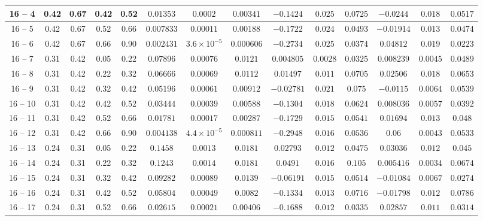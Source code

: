 \begin{longtable}{|*{14}{c|}}
\hline
16 -- 4 & 0.42 & 0.67 & 0.42 & 0.52 & $0.01353$ & $0.0002$ & $0.00341$ & $-0.1424$ & $0.025$ & $0.0725$ & $-0.0244$ & $0.018$ & $0.0517$ \\
\hline
16 -- 5 & 0.42 & 0.67 & 0.52 & 0.66 & $0.007833$ & $0.00011$ & $0.00188$ & $-0.1722$ & $0.024$ & $0.0493$ & $-0.01914$ & $0.013$ & $0.0474$ \\
\hline
16 -- 6 & 0.42 & 0.67 & 0.66 & 0.90 & $0.002431$ & $3.6\times 10^{-5}$ & $0.000606$ & $-0.2734$ & $0.025$ & $0.0374$ & $0.04812$ & $0.019$ & $0.0223$ \\
\hline
16 -- 7 & 0.31 & 0.42 & 0.05 & 0.22 & $0.07896$ & $0.00076$ & $0.0121$ & $0.004805$ & $0.0028$ & $0.0325$ & $0.008239$ & $0.0045$ & $0.0489$ \\
\hline
16 -- 8 & 0.31 & 0.42 & 0.22 & 0.32 & $0.06666$ & $0.00069$ & $0.0112$ & $0.01497$ & $0.011$ & $0.0705$ & $0.02506$ & $0.018$ & $0.0653$ \\
\hline
16 -- 9 & 0.31 & 0.42 & 0.32 & 0.42 & $0.05196$ & $0.00061$ & $0.00912$ & $-0.02781$ & $0.021$ & $0.075$ & $-0.0115$ & $0.0064$ & $0.0539$ \\
\hline
16 -- 10 & 0.31 & 0.42 & 0.42 & 0.52 & $0.03444$ & $0.00039$ & $0.00588$ & $-0.1304$ & $0.018$ & $0.0624$ & $0.008036$ & $0.0057$ & $0.0392$ \\
\hline
16 -- 11 & 0.31 & 0.42 & 0.52 & 0.66 & $0.01781$ & $0.00017$ & $0.00287$ & $-0.1729$ & $0.015$ & $0.0541$ & $0.01694$ & $0.013$ & $0.048$ \\
\hline
16 -- 12 & 0.31 & 0.42 & 0.66 & 0.90 & $0.004138$ & $4.4\times 10^{-5}$ & $0.000811$ & $-0.2948$ & $0.016$ & $0.0536$ & $0.06$ & $0.0043$ & $0.0533$ \\
\hline
16 -- 13 & 0.24 & 0.31 & 0.05 & 0.22 & $0.1458$ & $0.0013$ & $0.0181$ & $0.02793$ & $0.012$ & $0.0475$ & $0.03036$ & $0.012$ & $0.045$ \\
\hline
16 -- 14 & 0.24 & 0.31 & 0.22 & 0.32 & $0.1243$ & $0.0014$ & $0.0181$ & $0.0491$ & $0.016$ & $0.105$ & $0.005416$ & $0.0034$ & $0.0674$ \\
\hline
16 -- 15 & 0.24 & 0.31 & 0.32 & 0.42 & $0.09282$ & $0.00089$ & $0.0139$ & $-0.06191$ & $0.015$ & $0.0514$ & $-0.01084$ & $0.0067$ & $0.0274$ \\
\hline
16 -- 16 & 0.24 & 0.31 & 0.42 & 0.52 & $0.05804$ & $0.00049$ & $0.0082$ & $-0.1334$ & $0.013$ & $0.0716$ & $-0.01798$ & $0.012$ & $0.0786$ \\
\hline
16 -- 17 & 0.24 & 0.31 & 0.52 & 0.66 & $0.02615$ & $0.00021$ & $0.00406$ & $-0.1688$ & $0.012$ & $0.0335$ & $0.02857$ & $0.011$ & $0.0314$ \\

\end{longtable}
